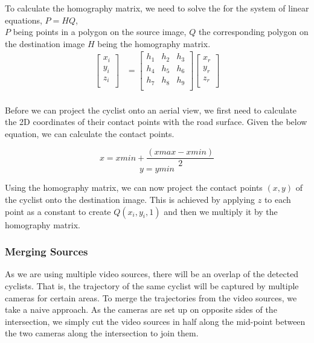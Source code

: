 To calculate the homography matrix, we need to solve the for the system of linear equations, $P = HQ$,
\ \\
$P$ being points in a polygon on the source image, $Q$ the corresponding polygon on the destination image $H$ being the homography matrix.
\begin{align}
\label{eq:3}
  \begin{bmatrix}
    x_{i} \\
    y_{i} \\
    z_{i} \\
  \end{bmatrix}
  &= \begin{bmatrix}
      h_1 & h_2 & h_3 \\
      h_4 & h_5 & h_6 \\
      h_7 & h_8 & h_9 \\
  \end{bmatrix}
  \begin{bmatrix}
    x_{r} \\
    y_{r} \\
    z_{r} \\
  \end{bmatrix}
\end{align}
\ \\

Before we can project the cyclist onto an aerial view, we first need to calculate the 2D coordinates of their contact points with the road surface.
Given the below equation, we can calculate the contact points.

$$x = xmin + \frac{(xmax - xmin)}{2}$$
$$y = ymin$$

Using the homography matrix, we can now project the contact points $(x, y)$ of the cyclist onto the destination
image. This is achieved by applying $z$ to each point as a constant to create $Q(x_i, y_i, 1)$ and then we multiply it by the homography matrix. 

\subsubsection{Merging Sources}
As we are using multiple video sources, there will be an overlap of the detected cyclists. 
That is, the trajectory of the same cyclist will be captured by multiple cameras for certain areas. 
To merge the trajectories from the video sources, we take a naive approach. As the cameras are set up on
opposite sides of the intersection, we simply cut the video sources in half along the mid-point between
the two cameras along the intersection to join them.


